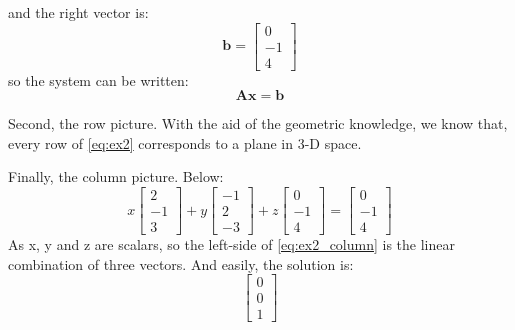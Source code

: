         and the right vector is:
            \begin{equation}
                \mathbf{b} = 
                \begin{bmatrix}
                    0 \\
                    -1 \\
                    4 
                \end{bmatrix}
            \end{equation}
        so the system can be written:
            \begin{equation}
                \mathbf{Ax = b}
            \end{equation}
        
        Second, the row picture. With the aid of the geometric knowledge, we know that,
        every row of \eqref{eq:ex2} corresponds to a plane in 3-D space.

        Finally, the column picture. Below:
            \begin{equation} \label{eq:ex2_column}
                x
                \begin{bmatrix}
                    2 \\ 
                    -1\\
                    3
                \end{bmatrix} + 
                y
                \begin{bmatrix}
                    -1 \\ 
                    2\\
                    -3
                \end{bmatrix} + 
                z
                \begin{bmatrix}
                    0 \\ 
                    -1\\
                    4
                \end{bmatrix} = 
                \begin{bmatrix}
                    0 \\ 
                    -1\\
                    4
                \end{bmatrix} 
            \end{equation}
        As x, y and z are scalars, so the left-side of \eqref{eq:ex2_column} is the linear combination of three vectors.
        And easily, the solution is:
            \begin{equation}
                \begin{bmatrix}
                    0\\
                    0\\
                    1
                \end{bmatrix}
            \end{equation}
        
